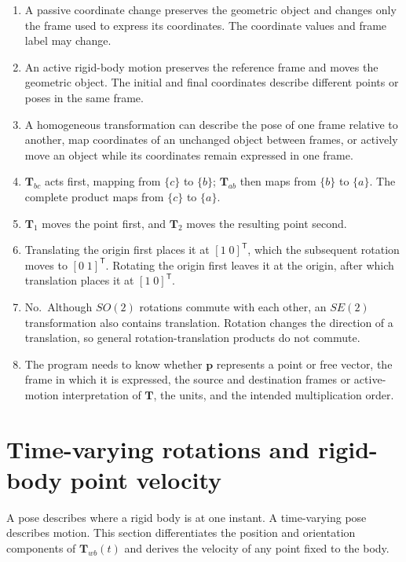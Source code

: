 \documentclass[
  australian,
  12pt,
  letterpaper,
  DIV=11,
  numbers=noendperiod,
  twoside]{scrreprt}
\providecommand{\tightlist}{%
  \setlength{\itemsep}{0pt}\setlength{\parskip}{0pt}}
\begin{document}
\begin{enumerate}
\def\labelenumi{\arabic{enumi}.}
\tightlist
\item
  A passive coordinate change preserves the geometric object and changes
  only the frame used to express its coordinates. The coordinate values
  and frame label may change.
\item
  An active rigid-body motion preserves the reference frame and moves
  the geometric object. The initial and final coordinates describe
  different points or poses in the same frame.
\item
  A homogeneous transformation can describe the pose of one frame
  relative to another, map coordinates of an unchanged object between
  frames, or actively move an object while its coordinates remain
  expressed in one frame.
\item
  \(\mathbf T_{bc}\) acts first, mapping from \(\{c\}\) to \(\{b\}\);
  \(\mathbf T_{ab}\) then maps from \(\{b\}\) to \(\{a\}\). The complete
  product maps from \(\{c\}\) to \(\{a\}\).
\item
  \(\mathbf T_1\) moves the point first, and \(\mathbf T_2\) moves the
  resulting point second.
\item
  Translating the origin first places it at \([1\;0]^\mathsf T\), which
  the subsequent rotation moves to \([0\;1]^\mathsf T\). Rotating the
  origin first leaves it at the origin, after which translation places
  it at \([1\;0]^\mathsf T\).
\item
  No.~Although \(SO(2)\) rotations commute with each other, an \(SE(2)\)
  transformation also contains translation. Rotation changes the
  direction of a translation, so general rotation-translation products
  do not commute.
\item
  The program needs to know whether \(\mathbf p\) represents a point or
  free vector, the frame in which it is expressed, the source and
  destination frames or active-motion interpretation of \(\mathbf T\),
  the units, and the intended multiplication order.
\end{enumerate}

\section{Time-varying rotations and rigid-body point
velocity}\label{time-varying-rotations-and-rigid-body-point-velocity}

A pose describes where a rigid body is at one instant. A time-varying
pose describes motion. This section differentiates the position and
orientation components of \(\mathbf T_{wb}(t)\) and derives the velocity
of any point fixed to the body.
\end{document}
